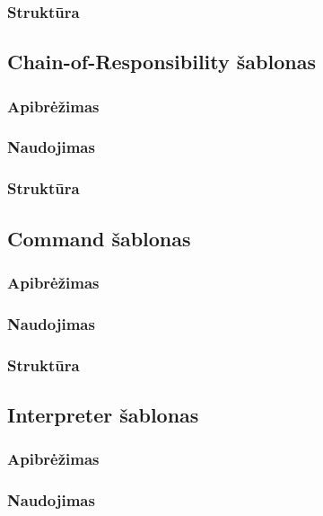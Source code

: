 \documentclass[10pt]{IEEEtran}
\begin{document}
			\subsubsection{Struktūra}

		\subsection{Chain-of-Responsibility šablonas}

			\subsubsection{Apibrėžimas}

			\subsubsection{Naudojimas}

			\subsubsection{Struktūra}

		\subsection{Command šablonas}

			\subsubsection{Apibrėžimas}

			\subsubsection{Naudojimas}

			\subsubsection{Struktūra}

		\subsection{Interpreter šablonas}

			\subsubsection{Apibrėžimas}

			\subsubsection{Naudojimas}
\end{document}
